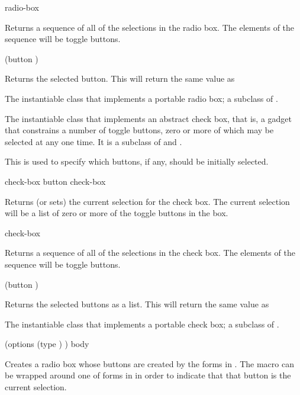  {radio-box}

Returns a sequence of all of the selections in the radio box.  The elements of
the sequence will be toggle buttons.

 {(button )}

Returns the selected button.  This will return the same value as


The instantiable class that implements a portable radio box; a subclass of
.



The instantiable class that implements an abstract check box, that is, a gadget
that constrains a number of toggle buttons, zero or more of which may be
selected at any one time.  It is a subclass of  and
.


This is used to specify which buttons, if any, should be initially selected.

 {check-box}
 {button check-box}

Returns (or sets) the current selection for the check box.  The current
selection will be a list of zero or more of the toggle buttons in the box.

 {check-box}

Returns a sequence of all of the selections in the check box.  The elements of
the sequence will be toggle buttons.

 {(button )}

Returns the selected buttons as a list.  This will return the same value as


The instantiable class that implements a portable check box; a subclass of
.


 {(\rest options \key (type ) \allow) \body body} 

Creates a radio box whose buttons are created by the forms in .  The
macro  can be wrapped around one of forms in
 in order to indicate that that button is the current selection.

